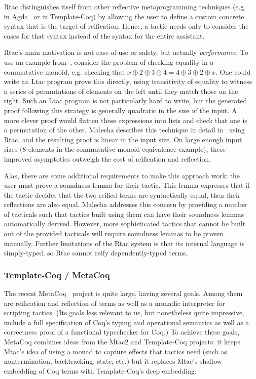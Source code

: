 Rtac distinguishes itself from other reflective metaprogramming techniques
(e.g. in Agda~\cite{agda-reflection} or in Template-Coq) by allowing the user to
define a custom concrete syntax that is the target of reification.
Hence, a tactic needs only to consider the cases for that syntax instead of the
syntax for the entire assistant.

Rtac's main motivation is not ease-of-use or safety, but actually
\emph{performance}.
To use an example from~\cite{rtac}, consider the problem of checking equality in
a commutative monoid, e.g. checking that $x \oplus 2 \oplus 3 \oplus 4 = 4
\oplus 3 \oplus 2 \oplus x$.
One could write an Ltac program prove this directly, using transitivity of
equality to witness a series of permutations of elements on the left until they
match those on the right.
Such an Ltac program is not particularly hard to write, but the generated proof
following this strategy is generally quadratic in the size of the input.
A more clever proof would flatten these expressions into lists and
check that one is a permutation of the other.
Malecha describes this technique in detail in~\cite{rtac} using Rtac, and the
resulting proof is linear in the input size.
On large enough input sizes (8 elements in the commutative monoid equivalence
example), these improved asymptotics outweigh the cost of reification and
reflection.

Alas, there are some additional requirements to make this approach work:
the user must prove a soundness lemma for their tactic.
This lemma expresses that if the tactic decides that the two reified terms
are syntactically equal, then their reflections are also equal.
Malecha addresses this concern by providing a number of tacticals such that
tactics built using them can have their soundness lemmas automatically
derived.
However, more sophisticated tactics that cannot be built out of the provided
tacticals will require soundness lemmas to be proven manually.
Further limitations of the Rtac system is that its internal language is
simply-typed, so Rtac cannot reify dependently-typed terms.

\subsubsection{Template-Coq / MetaCoq}

The recent MetaCoq~\cite{metacoq} project is quite large, having several goals.
Among them are reification and reflection of terms as well as a monadic
interpreter for scripting tactics.
(Its goals less relevant to us, but nonetheless quite impressive, include a full
specification of Coq's typing and operational semantics as well as a correctness
proof of a functional typechecker for Coq.)
To achieve these goals, MetaCoq combines ideas from the Mtac2 and Template-Coq
projects:
it keeps Mtac's idea of using a monad to capture effects that tactics need
(such as nontermination, backtracking, state, etc.) but it replaces Mtac's
shallow embedding of Coq terms with Template-Coq's deep embedding.

